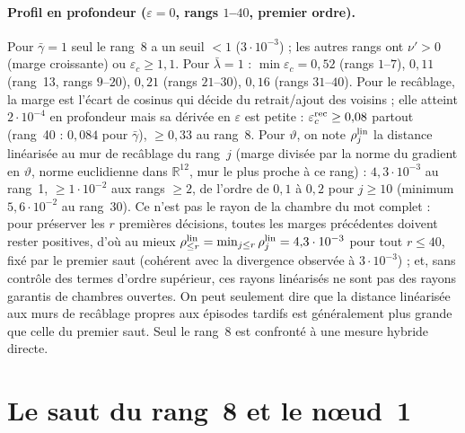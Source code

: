 \documentclass[11pt,a4paper]{article}
\theoremstyle{remark}
\newcommand{\R}{\mathbb R}
\newcommand{\vth}{\vartheta}
\begin{document}
\paragraph{Profil en profondeur ($\varepsilon=0$, rangs $1$--$40$, premier ordre).} Pour $\bar\gamma=1$ seul le rang~8 a un seuil $<1$ ($3\cdot10^{-3}$) ; les autres rangs ont $\nu'>0$ (marge croissante) ou $\varepsilon_c\ge1{,}1$. Pour $\bar\lambda=1$ : $\min\varepsilon_c=0{,}52$ (rangs $1$--$7$), $0{,}11$ (rang~13, rangs $9$--$20$), $0{,}21$ (rangs $21$--$30$), $0{,}16$ (rangs $31$--$40$). Pour le recâblage, la marge est l'\'ecart de cosinus qui d\'ecide du retrait/ajout des voisins ; elle atteint $2\cdot10^{-4}$ en profondeur mais sa d\'eriv\'ee en $\varepsilon$ est petite : $\varepsilon_c^{\rm rec}\ge0{,}08$ partout (rang~40 : $0{,}084$ pour $\bar\gamma$), $\ge0{,}33$ au rang~8. Pour $\vth$, on note $\rho_j^{\rm lin}$ la distance lin\'earis\'ee au mur de recâblage du rang~$j$ (marge divis\'ee par la norme du gradient en $\vth$, norme euclidienne dans $\R^{12}$, mur le plus proche \`a ce rang) : $4{,}3\cdot10^{-3}$ au rang~1, $\ge1\cdot10^{-2}$ aux rangs $\ge2$, de l'ordre de $0{,}1$ \`a $0{,}2$ pour $j\ge10$ (minimum $5{,}6\cdot10^{-2}$ au rang~30). Ce n'est pas le rayon de la chambre du mot complet : pour pr\'eserver les $r$ premi\`eres d\'ecisions, toutes les marges pr\'ec\'edentes doivent rester positives, d'o\`u au mieux $\rho_{\le r}^{\rm lin}=\min_{j\le r}\rho_j^{\rm lin}=4{,}3\cdot10^{-3}$ pour tout $r\le40$, fix\'e par le premier saut (coh\'erent avec la divergence observ\'ee \`a $3\cdot10^{-3}$) ; et, sans contr\^ole des termes d'ordre sup\'erieur, ces rayons lin\'earis\'es ne sont pas des rayons garantis de chambres ouvertes. On peut seulement dire que la distance lin\'earis\'ee aux murs de recâblage propres aux \'episodes tardifs est g\'en\'eralement plus grande que celle du premier saut. Seul le rang~8 est confront\'e \`a une mesure hybride directe.

\section{Le saut du rang~8 et le n\oe ud~1}\label{sec:saut8}
\end{document}
